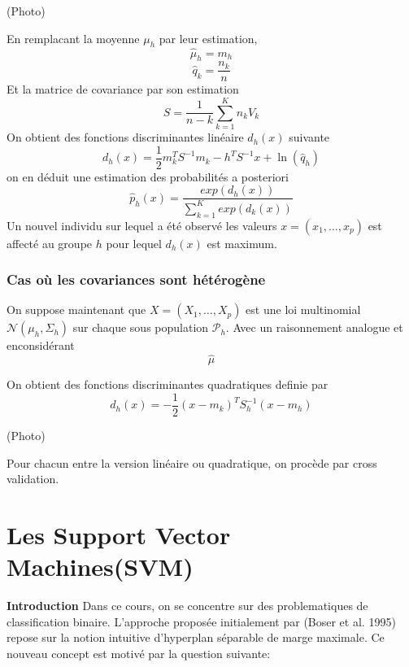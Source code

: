\documentclass{article}
\begin{document}
(Photo)

En remplacant la moyenne $\mu_h$ par leur estimation,
\begin{equation}
\hat{\mu}_h=m_h
\end{equation}
\begin{equation}
\hat{q}_k=\frac{n_k}{n}
\end{equation}
Et la matrice de covariance par son estimation
\begin{equation}
S=\frac{1}{n-k}\sum_{k=1}^Kn_kV_k
\end{equation}
On obtient des fonctions discriminantes lin\'eaire $d_h(x)$ suivante
\begin{equation}
d_h(x)=\frac{1}{2}m_k^TS^{-1}m_k-h^TS^{-1}x+\ln(\hat{q}_h)
\end{equation}
on en d\'eduit une estimation des probabilit\'es a posteriori
\begin{equation}
\hat{p}_h(x)=\frac{exp(d_h(x))}{\sum_{k=1}^K exp(d_k(x))}
\end{equation}
Un nouvel individu sur lequel a \'et\'e observ\'e les valeurs $x=(x_1,\ldots,x_p)$ est affect\'e au groupe $h$ pour lequel $d_h(x)$ est maximum.

\subsubsection{Cas o\`u les covariances sont h\'et\'erog\`ene}
On suppose maintenant que $X=(X_1,\ldots,X_p)$ est une loi multinomial $\mathcal{N}(\mu_h,\Sigma_h)$ sur chaque sous population $\mathcal{P}_h$.
Avec un raisonnement analogue et enconsid\'erant
\begin{equation}
\hat{\mu}
\end{equation}

On obtient des fonctions discriminantes quadratiques definie par 
\begin{equation}
d_h(x)=-\frac{1}{2}(x-m_k)^TS_h^{-1}(x-m_h)
\end{equation}

(Photo)

Pour chacun entre la version lin\'eaire ou quadratique, on proc\`ede par cross validation.

\section{Les Support Vector Machines(SVM)}
\textbf{Introduction}
Dans ce cours, on se concentre sur des problematiques de classification binaire. L'approche propos\'ee initialement par (Boser et al.  1995) repose sur la notion intuitive d'hyperplan s\'eparable de marge maximale. Ce nouveau concept est motiv\'e par la question suivante: 
\end{document}
